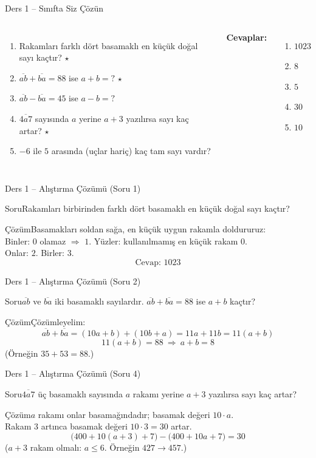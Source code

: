 \documentclass[aspectratio=169,11pt,handout]{beamer}
\newcommand{\soru}[3]{%
\begin{frame}{#1}
  \begin{block}{Soru}\large #2\end{block}
  \pause
  \begin{exampleblock}{Çözüm}\large #3\end{exampleblock}
\end{frame}}
\newcommand{\ab}[1]{\overline{#1}}
\begin{document}
\begin{frame}{Ders 1 -- Sınıfta Siz Çözün}
\begin{columns}[t]
\begin{enumerate}
\item Rakamları farklı dört basamaklı en küçük doğal sayı kaçtır? \(\star\)
\item \(\ab{ab}+\ab{ba}=88\) ise \(a+b=?\) \(\star\)
\item \(\ab{ab}-\ab{ba}=45\) ise \(a-b=?\)
\item \(\ab{4a7}\) sayısında \(a\) yerine \(a+3\) yazılırsa sayı kaç artar? \(\star\)
\item \(-6\) ile \(5\) arasında (uçlar hariç) kaç tam sayı vardır?
\end{enumerate}
\pause
\textbf{Cevaplar:}
\begin{enumerate}
\item \(1023\)
\item \(8\)
\item \(5\)
\item \(30\)
\item \(10\)
\end{enumerate}
\end{columns}
\vspace{4pt}{\footnotesize \(\star\) işaretli soruların adım adım çözümü sonraki slaytlardadır.}
\end{frame}

\soru{Ders 1 -- Alıştırma Çözümü (Soru 1)}
{Rakamları birbirinden farklı dört basamaklı en küçük doğal sayı kaçtır?}
{Basamakları soldan sağa, en küçük uygun rakamla doldururuz:\\[3pt]
Binler: \(0\) olamaz \(\Rightarrow\) \(1\). \quad Yüzler: kullanılmamış en küçük rakam \(0\).\\[3pt]
Onlar: \(2\). \quad Birler: \(3\).
\[\text{Cevap: } 1023\]}

\soru{Ders 1 -- Alıştırma Çözümü (Soru 2)}
{\(\ab{ab}\) ve \(\ab{ba}\) iki basamaklı sayılardır. \(\ab{ab}+\ab{ba}=88\) ise \(a+b\) kaçtır?}
{Çözümleyelim:
\[\ab{ab}+\ab{ba}=(10a+b)+(10b+a)=11a+11b=11(a+b)\]
\[11(a+b)=88\ \Rightarrow\ a+b=8\]
(Örneğin \(35+53=88\).)}

\soru{Ders 1 -- Alıştırma Çözümü (Soru 4)}
{\(\ab{4a7}\) üç basamaklı sayısında \(a\) rakamı yerine \(a+3\) yazılırsa sayı kaç artar?}
{\(a\) rakamı onlar basamağındadır; basamak değeri \(10\cdot a\).\\[3pt]
Rakam \(3\) artınca basamak değeri \(10\cdot 3=30\) artar.
\[\big(400+10(a+3)+7\big)-\big(400+10a+7\big)=30\]
(\(a+3\) rakam olmalı: \(a\le 6\). Örneğin \(427\to 457\).)}
\end{document}
